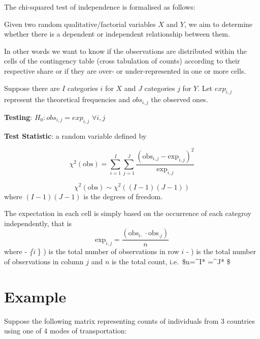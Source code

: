 \documentclass[
  letterpaper,
  DIV=11,
  numbers=noendperiod]{scrreprt}
\begin{document}
The chi-squared test of independence is formalised as follows:

Given two random qualitative/factorial variables \(X\) and \(Y\), we aim
to determine whether there is a dependent or independent relationship
between them.

In other words we want to know if the observations are distributed
within the cells of the contingency table (cross tabulation of counts)
according to their respective share or if they are over- or
under-represented in one or more cells.

Suppose there are \(I\) categories \(i\) for \(X\) and \(J\) categories
\(j\) for \(Y\). Let \(exp_{i,j}\) represent the theoretical frequencies
and \(obs_{i,j}\) the observed ones.

\textbf{Testing}: \(H_0: obs_{i,j} = exp_{i,j}\) \(\forall i,j\)

\textbf{Test Statistic}: a random variable defined by

\[ \chi^2(\text{obs}) = \sum_{i=1}^I \sum_{j=1}^J \dfrac{(\text{obs}_{i,j} - \text{exp}_{i,j})^2}{\text{exp}_{i,j}}\]

\[\chi^2(\text{obs}) \sim \chi^2((I-1)(J-1)) \] where \((I-1)(J-1)\) is
the degrees of freedom.

The expectation in each cell is simply based on the occurrence of each
categroy independently, that is
\[ \text{exp}_{i,j} = \frac{(\text{obs}_{i \cdot} \cdot \text{obs}_{\cdot j})}{n} \]
where - \emph{\{i} \cdot\} ) is the total number of
observations in row \(i\) -  ) is the total number of
observations in column \(j\) and \(n\) is the total count,
i.e.~\$n=\^{}I* =\^{}J*
 \$

\section{Example}\label{example-12}

Suppose the following matrix representing counts of individuals from 3
countries using one of 4 modes of transportation:
\end{document}
